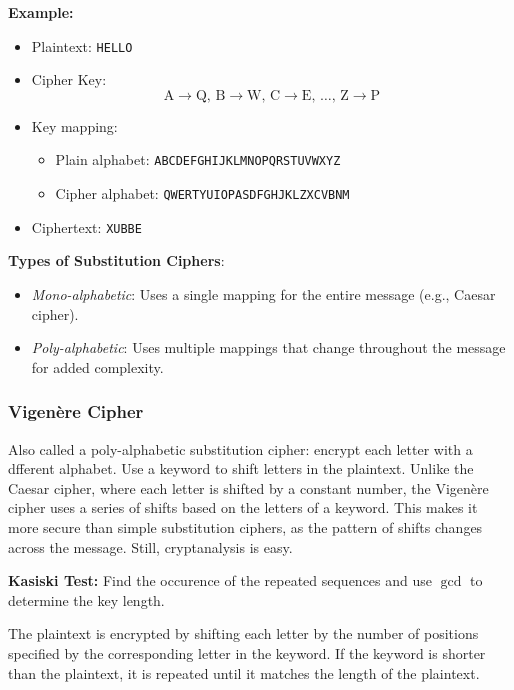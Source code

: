 \textbf{Example:}
\begin{itemize}
    \item Plaintext: \texttt{HELLO}
    
    \item Cipher Key:
    \[
    \text{A} \rightarrow \text{Q}, \, \text{B} \rightarrow \text{W}, \, \text{C} \rightarrow \text{E}, \, \ldots, \, \text{Z} \rightarrow \text{P}
    \]

    \item Key mapping:
        \begin{itemize}
            \item Plain alphabet: \texttt{ABCDEFGHIJKLMNOPQRSTUVWXYZ}
            \item Cipher alphabet: \texttt{QWERTYUIOPASDFGHJKLZXCVBNM}
        \end{itemize}
    
    \item Ciphertext: \texttt{XUBBE}
\end{itemize}


\textbf{Types of Substitution Ciphers}:
    \begin{itemize}
        \item \emph{Mono-alphabetic}: Uses a single mapping for the entire message (e.g., Caesar cipher).
        \item \emph{Poly-alphabetic}: Uses multiple mappings that change throughout the message for added complexity.
    \end{itemize}

\subsubsection{Vigenère Cipher}
Also called a poly-alphabetic substitution cipher: encrypt each letter with a dfferent alphabet. Use a keyword to shift letters in the plaintext. Unlike the Caesar cipher, where each letter is shifted by a constant number, the Vigenère cipher uses a series of shifts based on the letters of a keyword. This makes it more secure than simple substitution ciphers, as the pattern of shifts changes across the message.  Still, cryptanalysis is easy.

\begin{defn}
    \textbf{Kasiski Test:} Find the occurence of the repeated sequences and use $\gcd$ to determine the key length.
\end{defn}

The plaintext is encrypted by shifting each letter by the number of positions specified by the corresponding letter in the keyword. If the keyword is shorter than the plaintext, it is repeated until it matches the length of the plaintext.\\

